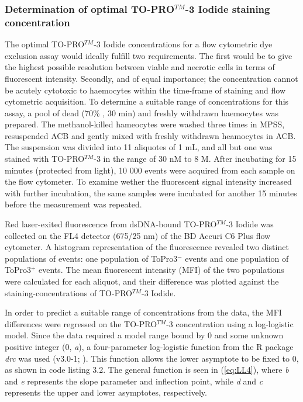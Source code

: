 \subsubsection{Determination of optimal TO-PRO$^{TM}$-3 Iodide staining concentration}
The optimal TO-PRO$^{TM}$-3 Iodide concentrations for a flow cytometric dye exclusion assay would ideally fulfill two requirements. The first would be to give the highest possible resolution between viable and necrotic cells in terms of fluorescent intensity. Secondly, and of equal importance; the concentration cannot be acutely cytotoxic to haemocytes within the time-frame of staining and flow cytometric acquisition. To determine a suitable range of concentrations for this assay, a pool of dead (70\% , 30 min) and freshly withdrawn haemocytes was prepared. The methanol-killed hameocytes were washed three times in MPSS, resuspended ACB and gently mixed with freshly withdrawn heamocytes in ACB. The suspension was divided into 11 aliquotes of 1 mL, and all but one was stained with TO-PRO$^{TM}$-3 in the range of 30 nM to 8 \micro M. After incubating for 15 minutes (protected from light), 10 000 events were acquired from each sample on the flow cytometer. To examine wether the fluorescent signal intensity increased with further incubation, the same samples were incubated for another 15 minutes before the measurement was repeated.

Red laser-exited fluorescence from dsDNA-bound TO-PRO$^{TM}$-3 Iodide was collected on the FL4 detector (675/25 nm) of the BD Accuri C6 Plus flow cytometer. A histogram representation of the fluorescence revealed two distinct populations of events: one population of ToPro3$^{-}$ events and one population of ToPro3$^{+}$ events. The mean fluorescent intensity (MFI) of the two populations were calculated for each aliquot, and their difference was plotted against the staining-concentrations of TO-PRO$^{TM}$-3 Iodide.

In order to predict a suitable range of concentrations from the data, the MFI differences were regressed on the TO-PRO$^{TM}$-3 concentration using a log-logistic model. Since the data required a model range bound by 0 and some unknown positive integer (0, \emph{a}), a four-parameter log-logistic function from the R package \emph{drc} was used (v3.0-1; \cite{drc}). This function allows the lower asymptote to be fixed to 0, as shown in code listing 3.2. The general function is seen in (\ref{eq:LL4}), where \emph{b} and \emph{e} represents the slope parameter and inflection point, while \emph{d} and \emph{c} represents the upper and lower asymptotes, respectively.

